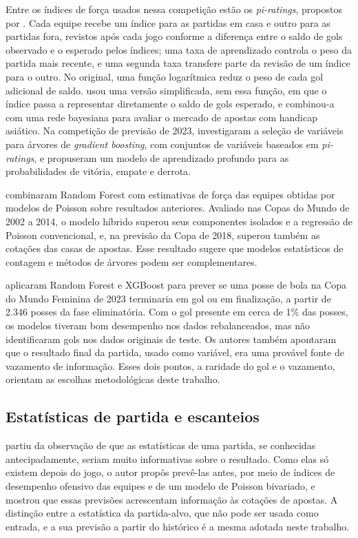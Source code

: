 Entre os índices de força usados nessa competição estão os \textit{pi-ratings}, propostos por . Cada equipe recebe um índice para as partidas em casa e outro para as partidas fora, revistos após cada jogo conforme a diferença entre o saldo de gols observado e o esperado pelos índices; uma taxa de aprendizado controla o peso da partida mais recente, e uma segunda taxa transfere parte da revisão de um índice para o outro. No original, uma função logarítmica reduz o peso de cada gol adicional de saldo.  usou uma versão simplificada, sem essa função, em que o índice passa a representar diretamente o saldo de gols esperado, e combinou-a com uma rede bayesiana para avaliar o mercado de apostas com handicap asiático. Na competição de previsão de 2023,  investigaram a seleção de variáveis para árvores de \textit{gradient boosting}, com conjuntos de variáveis baseados em \textit{pi-ratings}, e propuseram um modelo de aprendizado profundo para as probabilidades de vitória, empate e derrota.

 combinaram Random Forest com estimativas de força das equipes obtidas por modelos de Poisson sobre resultados anteriores. Avaliado nas Copas do Mundo de 2002 a 2014, o modelo híbrido superou seus componentes isolados e a regressão de Poisson convencional, e, na previsão da Copa de 2018, superou também as cotações das casas de apostas. Esse resultado sugere que modelos estatísticos de contagem e métodos de árvores podem ser complementares.

 aplicaram Random Forest e XGBoost para prever se uma posse de bola na Copa do Mundo Feminina de 2023 terminaria em gol ou em finalização, a partir de 2.346 posses da fase eliminatória. Com o gol presente em cerca de 1\% das posses, os modelos tiveram bom desempenho nos dados rebalanceados, mas não identificaram gols nos dados originais de teste. Os autores também apontaram que o resultado final da partida, usado como variável, era uma provável fonte de vazamento de informação. Esses dois pontos, a raridade do gol e o vazamento, orientam as escolhas metodológicas deste trabalho.

\subsection{Estatísticas de partida e escanteios}\label{subsec:RelEscanteios}

 partiu da observação de que as estatísticas de uma partida, se conhecidas antecipadamente, seriam muito informativas sobre o resultado. Como elas só existem depois do jogo, o autor propôs prevê-las antes, por meio de índices de desempenho ofensivo das equipes e de um modelo de Poisson bivariado, e mostrou que essas previsões acrescentam informação às cotações de apostas. A distinção entre a estatística da partida-alvo, que não pode ser usada como entrada, e a sua previsão a partir do histórico é a mesma adotada neste trabalho.

